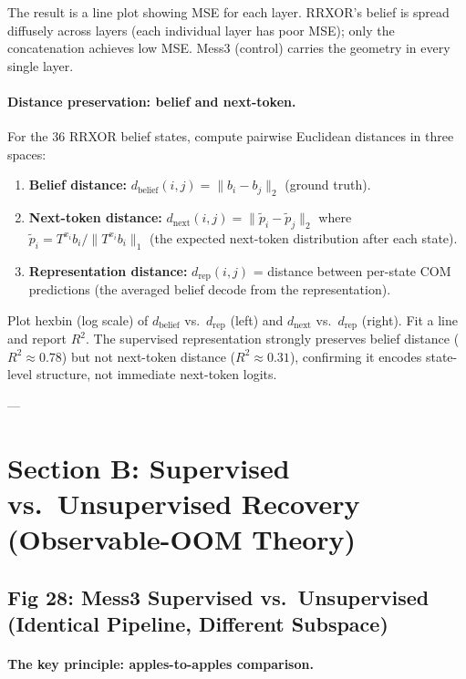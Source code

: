 \documentclass[11pt]{article}
\begin{document}
The result is a line plot showing MSE for each layer. RRXOR's belief is spread diffusely across layers (each individual layer has poor MSE); only the concatenation achieves low MSE. Mess3 (control) carries the geometry in every single layer.

\paragraph{Distance preservation: belief and next-token.}
For the 36 RRXOR belief states, compute pairwise Euclidean distances in three spaces:
\begin{enumerate}
\item \textbf{Belief distance:} $d_{\text{belief}}(i, j) = \| b_i - b_j \|_2$ (ground truth).
\item \textbf{Next-token distance:} $d_{\text{next}}(i, j) = \| \tilde{p}_i - \tilde{p}_j \|_2$ where $\tilde{p}_i = T^{x_i} b_i / \| T^{x_i} b_i \|_1$ (the expected next-token distribution after each state).
\item \textbf{Representation distance:} $d_{\text{rep}}(i, j)$ = distance between per-state COM predictions (the averaged belief decode from the representation).
\end{enumerate}

Plot hexbin (log scale) of $d_{\text{belief}}$ vs.\ $d_{\text{rep}}$ (left) and $d_{\text{next}}$ vs.\ $d_{\text{rep}}$ (right). Fit a line and report $R^2$. The supervised representation strongly preserves belief distance ($R^2 \approx 0.78$) but not next-token distance ($R^2 \approx 0.31$), confirming it encodes state-level structure, not immediate next-token logits.


---

\section{Section B: Supervised vs.\ Unsupervised Recovery (Observable-OOM Theory)}

\subsection{Fig 28: Mess3 Supervised vs.\ Unsupervised (Identical Pipeline, Different Subspace)}

\paragraph{The key principle: apples-to-apples comparison.}
\end{document}
